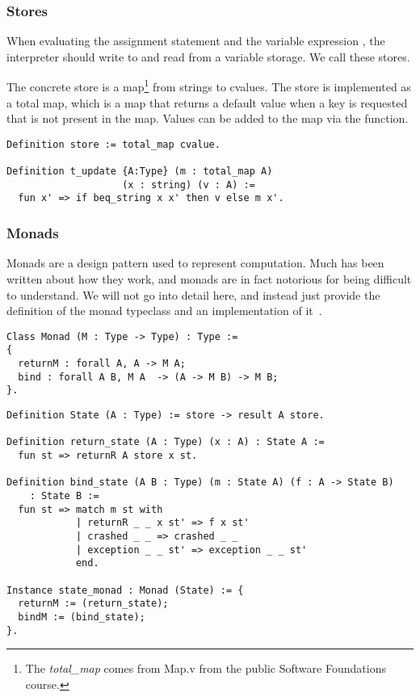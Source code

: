 \subsubsection{Stores}\label{sec:stores}
When evaluating the assignment statement  and the variable
expression , the interpreter should write to and read from a variable
storage. We call these stores. 

The concrete store is a map\footnote{The \textit{total\_map} comes from 
	Map.v from the public Software Foundations course.} 
from strings to cvalues. The store is implemented as a total map, which is a
map that returns a default value when a key is requested that is not present in
the map. Values can be added to the map via the  function.

\begin{verbatim}
Definition store := total_map cvalue.

Definition t_update {A:Type} (m : total_map A)
                    (x : string) (v : A) :=
  fun x' => if beq_string x x' then v else m x'.

\end{verbatim}

\subsubsection{Monads}\label{sec:monad}
Monads are a design pattern used to represent computation. Much has been
written about how they work, and monads are in fact notorious for being
difficult to understand. We will not go into detail here, and instead just 
provide the definition of the monad typeclass and an implementation of
it~\cite{kleisli1965every}.

\begin{verbatim}
Class Monad (M : Type -> Type) : Type :=
{
  returnM : forall A, A -> M A;
  bind : forall A B, M A  -> (A -> M B) -> M B;
}.
\end{verbatim}

\begin{verbatim}
Definition State (A : Type) := store -> result A store.

Definition return_state (A : Type) (x : A) : State A :=
  fun st => returnR A store x st.

Definition bind_state (A B : Type) (m : State A) (f : A -> State B) 
    : State B :=
  fun st => match m st with
            | returnR _ _ x st' => f x st'
            | crashed _ _ => crashed _ _
            | exception _ _ st' => exception _ _ st'
            end.

Instance state_monad : Monad (State) := {
  returnM := (return_state);
  bindM := (bind_state);
}.
\end{verbatim}

